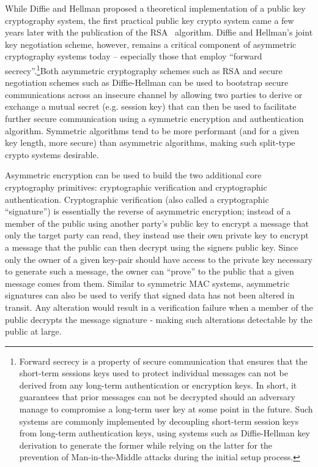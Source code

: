While Diffie and Hellman proposed a theoretical implementation of a
public key cryptography system, the first practical public key crypto
system came a few years later with the publication of the
RSA~\cite{rivest1978} algorithm. Diffie and Hellman's joint key
negotiation scheme, however, remains a critical component of
asymmetric cryptography systems today -- especially those that employ
``forward secrecy''.\footnote{Forward secrecy is a property of secure
  communication that ensures that the short-term sessions keys used to
  protect individual messages can not be derived from any long-term
  authentication or encryption keys. In short, it guarantees that
  prior messages can not be decrypted should an adversary manage to
  compromise a long-term user key at some point in the future. Such
  systems are commonly implemented by decoupling short-term session
  keys from long-term authentication keys, using systems such as
  Diffie-Hellman key derivation to generate the former while relying
  on the latter for the prevention of Man-in-the-Middle attacks during
  the initial setup process.}Both asymmetric cryptography schemes such
as RSA and secure negotiation schemes such as Diffie-Hellman can be
used to bootstrap secure communications across an insecure channel by
allowing two parties to derive or exchange a mutual secret
(e.g. session key) that can then be used to facilitate further secure
communication using a symmetric encryption and authentication
algorithm. Symmetric algorithms tend to be more performant (and for a
given key length, more secure) than asymmetric algorithms, making such
split-type crypto systems desirable.

Asymmetric encryption can be used to build the two additional core
cryptography primitives: cryptographic verification and cryptographic
authentication. Cryptographic verification (also called a
cryptographic ``signature'') is essentially the reverse of asymmetric
encryption; instead of a member of the public using another party's
public key to encrypt a message that only the target party can read,
they instead use their own private key to encrypt a message that the
public can then decrypt using the signers public key. Since only the
owner of a given key-pair should have access to the private key
necessary to generate such a message, the owner can ``prove'' to the
public that a given message comes from them. Similar to symmetric MAC
systems, asymmetric signatures can also be used to verify that signed
data has not been altered in transit. Any alteration would result in a
verification failure when a member of the public decrypts the message
signature - making such alterations detectable by the public at large.


